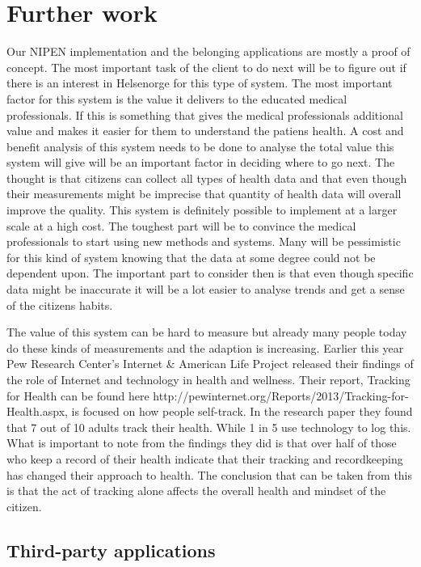 \section{Further work}

Our NIPEN implementation and the belonging applications are mostly a proof of concept. 
The most important task of the client to do next will be to figure out if there is an interest in Helsenorge for this type of system.
The most important factor for this system is the value it delivers to the educated medical professionals. 
If this is something that gives the medical professionals additional value and makes it easier for them to understand the patiens health. 
A cost and benefit analysis of this system needs to be done to analyse the total value this system will give will be an important factor in deciding where to go next.
The thought is that citizens can collect all types of health data and that even though their measurements might be imprecise that quantity of health data will overall improve the quality.
This system is definitely possible to implement at a larger scale at a high cost.
The toughest part will be to convince the medical professionals to start using new methods and systems. 
Many will be pessimistic for this kind of system knowing that the data at some degree could not be dependent upon.
The important part to consider then is that even though specific data might be inaccurate it will be a lot easier to analyse trends and get a sense of the citizens habits. 

The value of this system can be hard to measure but already many people today do these kinds of measurements and the adaption is increasing. 
Earlier this year Pew Research Center’s Internet \& American Life Project released their findings of the role of Internet and technology in health and wellness. 
Their report, Tracking for Health can be found here http://pewinternet.org/Reports/2013/Tracking-for-Health.aspx, is focused on how people self-track.
In the research paper they found that 7 out of 10 adults track their health.
While 1 in 5 use technology to log this. 
What is important to note from the findings they did is that over half of those who keep a record of their health indicate that their tracking and recordkeeping has changed their approach to health.
The conclusion that can be taken from this is that the act of tracking alone affects the overall health and mindset of the citizen. 

\subsection{Third-party applications}

